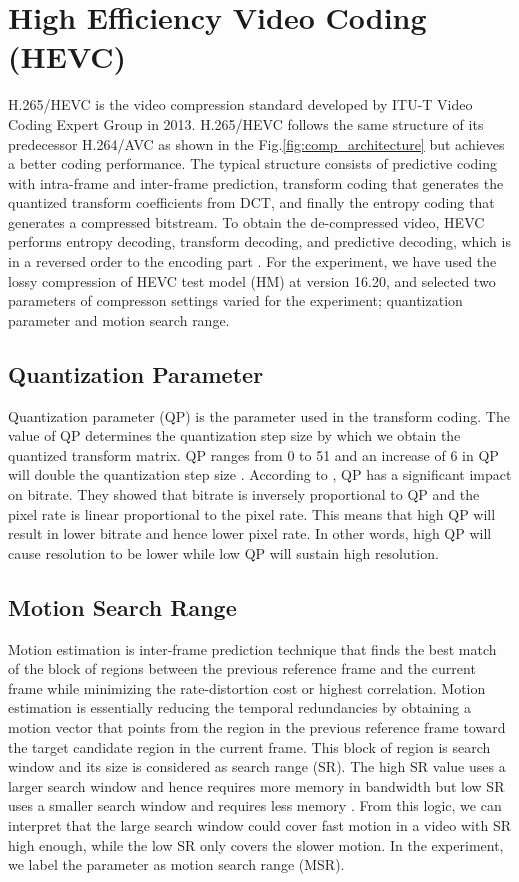 \section{High Efficiency Video Coding (HEVC)}
\label{sec:background/section_c}

H.265/HEVC is the video compression standard developed by ITU-T Video Coding Expert Group in 2013. H.265/HEVC follows the same structure of its predecessor H.264/AVC as shown in the Fig.\ref{fig:comp_architecture} but achieves a better coding performance. The typical structure consists of predictive coding with intra-frame and inter-frame prediction, transform coding that generates the quantized transform coefficients from DCT, and finally the entropy coding that generates a compressed bitstream. To obtain the de-compressed video, HEVC performs entropy decoding, transform decoding, and predictive decoding, which is in a reversed order to the encoding part \cite{zhang_overview_2019}. For the experiment, we have used the lossy compression of HEVC test model (HM) at version 16.20, and selected two parameters of compresson settings varied for the experiment; quantization parameter and motion search range.

\subsection{Quantization Parameter}
Quantization parameter (QP) is the parameter used in the transform coding. The value of QP determines the quantization step size by which we obtain the quantized transform matrix. QP ranges from 0 to 51 and an increase of 6 in QP will double the quantization step size \cite{sullivan_overview_2012} \cite{budagavi_hevc_2014}. According to \cite{sharrab_modeling_2017}, QP has a significant impact on bitrate. They showed that bitrate is inversely proportional to QP and the pixel rate is linear proportional to the pixel rate. This means that high QP will result in lower bitrate and hence lower pixel rate. In other words, high QP will cause resolution to be lower while low QP will sustain high resolution.

\subsection{Motion Search Range}
Motion estimation is inter-frame prediction technique that finds the best match of the block of regions between the previous reference frame and the current frame while minimizing the rate-distortion cost or highest correlation. Motion estimation is essentially reducing the temporal redundancies by obtaining a motion vector that points from the region in the previous reference frame toward the target candidate region in the current frame. This block of region is search window and its size is considered as search range (SR). The high SR value uses a larger search window and hence requires more memory in bandwidth but low SR uses a smaller search window and requires less memory  \cite{lou_adaptive_2010} \cite{bachu_review_2015}. From this logic, we can interpret that the large search window could cover fast motion in a video with SR high enough, while the low SR only covers the slower motion. In the experiment, we label the parameter as motion search range (MSR).

